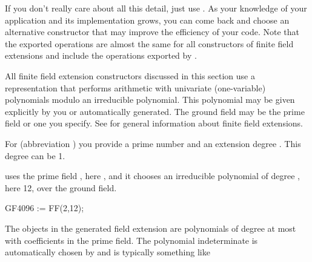{{{{{{{{{{{{{{{{If you don't really care about all this detail, just use
.
As your knowledge of your application and its \Language{} implementation
grows, you can come back and choose an alternative constructor that
may improve the efficiency of your code.
Note that the exported operations are almost the same for all constructors
of finite field extensions and include the operations exported by
.


All finite field extension constructors discussed in this
section
use a representation that performs arithmetic with univariate
(one-variable) polynomials modulo an irreducible polynomial.
This polynomial may be given explicitly by you or automatically
generated.
The ground field may be the prime field or one you specify.
See  for general
information about finite field extensions.

For  (abbreviation ) you provide a
prime number  and an extension degree .
This degree can be 1.
%
\begin{xtc}
\begin{xtccomment}
\Language{} uses the prime field ,
here ,
and it chooses an irreducible polynomial of degree ,
here 12, over the ground field.
\end{xtccomment}
\begin{spadsrc}
GF4096 := FF(2,12); 
\end{spadsrc}
\end{xtc}
%

The objects in the generated field extension are polynomials
of degree at most  with coefficients in the
prime field.
The polynomial indeterminate is automatically chosen by \Language{} and
is typically something like \spad{%
These (strange) variables are {\it only} for output display;
there are several ways to construct elements of this field.

}}}}}}}}}}}}}}}}}
